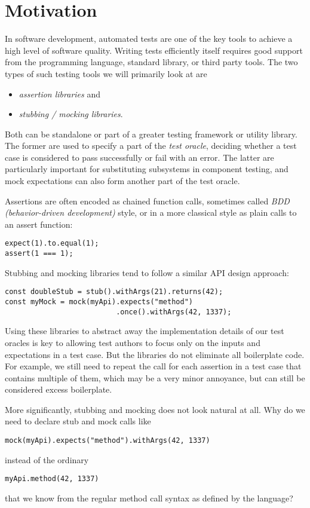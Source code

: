 \section{Motivation}
In software development, automated tests are one of the key tools
to achieve a high level of software quality.
Writing tests efficiently itself requires good support
from the programming language, standard library, or third party tools.
The two types of such testing tools we will primarily look at are
\begin{itemize}
  \item \textit{assertion libraries} and
  \item \textit{stubbing / mocking libraries}.
\end{itemize}
Both can be standalone or part of a greater testing framework or utility library.
The former are used to specify a part of the \textit{test oracle},
deciding whether a test case is considered to pass successfully or fail with an error.
The latter are particularly important for substituting subsystems in component testing,
and mock expectations can also form another part of the test oracle.

Assertions are often encoded as chained function calls,
sometimes called \textit{BDD (behavior-driven development)} style,
or in a more classical style as plain calls to an assert function:
\autocite{ChaiBddDoc}\autocite{ChaiTddDoc}
\begin{verbatim}
expect(1).to.equal(1);
assert(1 === 1);
\end{verbatim}
Stubbing and mocking libraries tend to follow a similar API design approach:
\autocite{SinonStubDoc}\autocite{SinonMockDoc}
\begin{verbatim}
const doubleStub = stub().withArgs(21).returns(42);
const myMock = mock(myApi).expects("method")
                          .once().withArgs(42, 1337);
\end{verbatim}

Using these libraries to abstract away
the implementation details of our test oracles
is key to allowing test authors to
focus only on the inputs and expectations in a test case.
But the libraries do not eliminate all boilerplate code.
For example, we still need to repeat the  call
for each assertion in a test case that contains multiple of them,
which may be a very minor annoyance,
but can still be considered excess boilerplate.

More significantly, stubbing and mocking does not look natural at all.
Why do we need to declare stub and mock calls like
\begin{verbatim}
mock(myApi).expects("method").withArgs(42, 1337)
\end{verbatim}
instead of the ordinary
\begin{verbatim}
myApi.method(42, 1337)
\end{verbatim}
that we know from the regular method call syntax as defined by the language?
